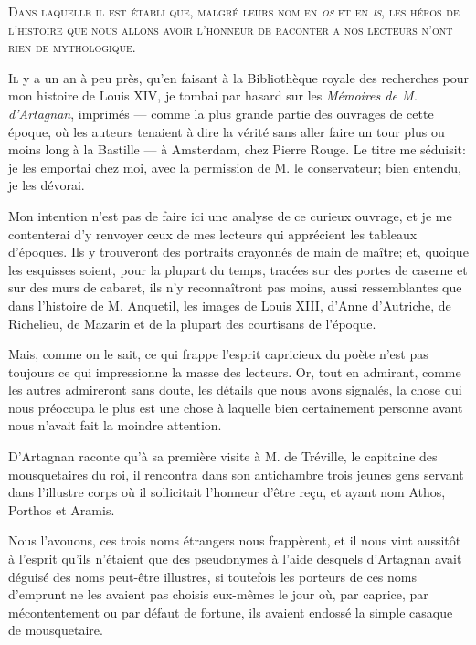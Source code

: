 
\begin{center}\scshape
Dans laquelle il est établi que, malgré leurs nom en \textit{os} et en \textit{is}, les héros de l'histoire que nous allons avoir l'honneur de raconter a nos lecteurs n'ont rien de mythologique. 
\end{center}
	
\lettrine{I}{l} y a un an à peu près, qu'en faisant à la Bibliothèque royale des recherches pour mon histoire de Louis XIV, je tombai par hasard sur les \textit{Mémoires de M. d'Artagnan}, imprimés --- comme la plus grande partie des ouvrages de cette époque, où les auteurs tenaient à dire la vérité sans aller faire un tour plus ou moins long à la Bastille --- à Amsterdam, chez Pierre Rouge. Le titre me séduisit: je les emportai chez moi, avec la permission de M. le conservateur; bien entendu, je les dévorai. 

Mon intention n'est pas de faire ici une analyse de ce curieux ouvrage, et je me contenterai d'y renvoyer ceux de mes lecteurs qui apprécient les tableaux d'époques. Ils y trouveront des portraits crayonnés de main de maître; et, quoique les esquisses soient, pour la plupart du temps, tracées sur des portes de caserne et sur des murs de cabaret, ils n'y reconnaîtront pas moins, aussi ressemblantes que dans l'histoire de M. Anquetil, les images de Louis XIII, d'Anne d'Autriche, de Richelieu, de Mazarin et de la plupart des courtisans de l'époque. 

Mais, comme on le sait, ce qui frappe l'esprit capricieux du poète n'est pas toujours ce qui impressionne la masse des lecteurs. Or, tout en admirant, comme les autres admireront sans doute, les détails que nous avons signalés, la chose qui nous préoccupa le plus est une chose à laquelle bien certainement personne avant nous n'avait fait la moindre attention. 

D'Artagnan raconte qu'à sa première visite à M. de Tréville, le capitaine des mousquetaires du roi, il rencontra dans son antichambre trois jeunes gens servant dans l'illustre corps où il sollicitait l'honneur d'être reçu, et ayant nom Athos, Porthos et Aramis. 

Nous l'avouons, ces trois noms étrangers nous frappèrent, et il nous vint aussitôt à l'esprit qu'ils n'étaient que des pseudonymes à l'aide desquels d'Artagnan avait déguisé des noms peut-être illustres, si toutefois les porteurs de ces noms d'emprunt ne les avaient pas choisis eux-mêmes le jour où, par caprice, par mécontentement ou par défaut de fortune, ils avaient endossé la simple casaque de mousquetaire. 

